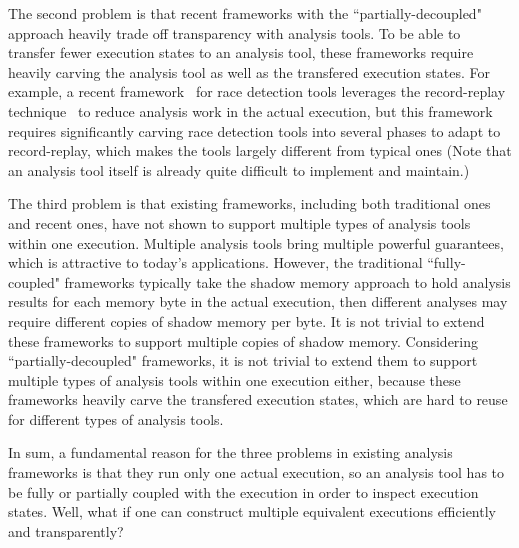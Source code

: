 The second problem is that recent frameworks with the ``partially-decoupled"
approach heavily trade off transparency with analysis tools. To be able to
transfer fewer execution states to an analysis tool, these frameworks require
heavily carving the analysis tool as well as the transfered execution states.
For example, a recent framework~\cite{wester:parallelizing:asplos13} for race
detection tools leverages the record-replay
technique~\cite{scribe:sigmetrics2010, respec:asplos10, racepro:sosp11} to
reduce analysis work in the actual execution, but this framework
requires significantly carving race detection tools into several phases to adapt
to record-replay, which makes the tools largely different from typical ones
(Note that an analysis tool itself is already quite difficult to implement and
maintain.)


The third problem is that existing frameworks, including both traditional ones
and recent ones, have not shown to support multiple types of analysis tools
within one execution. Multiple analysis tools bring multiple powerful
guarantees, which is attractive to today's applications. However, the
traditional ``fully-coupled" frameworks typically take the shadow memory
approach to hold analysis results for each memory byte in the actual execution,
then different analyses may require different copies of shadow memory per byte.
It is not trivial to extend these frameworks to support multiple copies of
shadow memory. Considering ``partially-decoupled" frameworks, it is not trivial
to extend them to support multiple types of analysis tools within one execution
either, because these frameworks heavily carve the transfered execution states,
which are hard to reuse for different types of analysis tools.


In sum, a fundamental reason for the three problems in existing analysis 
frameworks is that they run only one actual execution, so an analysis tool has
to be fully or partially coupled with the execution in order to inspect
execution states. Well, what if one can construct multiple equivalent
executions efficiently and transparently?







